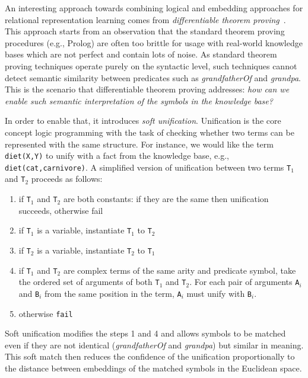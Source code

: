 An interesting approach towards combining logical and embedding approaches for relational representation learning comes from \textit{differentiable theorem proving}~\cite{DTP2017}.
This approach starts from an observation that the standard theorem proving procedures (e.g., Prolog) are often too brittle for usage with real-world knowledge bases which are not perfect and contain lots of noise.
As standard theorem proving techniques operate purely on the syntactic level, such techniques cannot detect semantic similarity between predicates such as \textit{grandfatherOf} and \textit{grandpa}.
This is the scenario that differentiable theorem proving addresses: \textit{how can we enable such semantic interpretation of the symbols in the knowledge base?}


In order to enable that, it introduces \textit{soft unification}.
Unification is the core concept logic programming with the task of checking whether two terms can be represented with the same structure.
For instance, we would like the term \texttt{diet(X,Y)} to unify with a fact from the knowledge base, e.g., \texttt{diet(cat,carnivore)}.
A simplified version of unification between two terms \texttt{T}$_1$ and \texttt{T}$_2$ proceeds as follows:
\begin{enumerate}
	\item if \texttt{T}$_1$ and \texttt{T}$_2$ are both constants: if they are the same then unification succeeds, otherwise fail
	\item if \texttt{T}$_1$ is a variable, instantiate \texttt{T}$_1$ to \texttt{T}$_2$
	\item if \texttt{T}$_2$ is a variable, instantiate \texttt{T}$_2$ to \texttt{T}$_1$
	\item if \texttt{T}$_1$ and \texttt{T}$_2$ are complex terms of the same arity and predicate symbol, take the ordered set of arguments of both \texttt{T}$_1$ and \texttt{T}$_2$. For each pair of arguments \texttt{A}$_i$ and \texttt{B}$_i$ from the same position in the term, \texttt{A}$_i$ must unify with \texttt{B}$_i$.
	\item otherwise \texttt{fail}
\end{enumerate}


Soft unification modifies the steps 1 and 4 and allows symbols to be matched even if they are not identical (\textit{grandfatherOf} and \textit{grandpa}) but similar in meaning. %
This soft match then reduces the confidence of the unification proportionally to the distance between embeddings of the matched symbols in the Euclidean space.












\cleardoublepage

